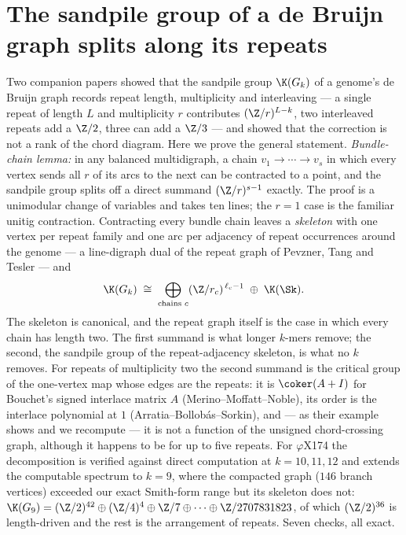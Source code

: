 \chapter{The sandpile group of a de Bruijn graph splits along its repeats}\label{chap:Bio3}
\begin{chapterabstract}
\noindent
Two companion papers showed that the sandpile group $\K(G_k)$ of a genome's de Bruijn
graph records repeat length, multiplicity and interleaving --- a single repeat of length
$L$ and multiplicity $r$ contributes $(\Z/r)^{L-k}$, two interleaved repeats add a $\Z/2$,
three can add a $\Z/3$ --- and showed that the correction is not a rank of the chord
diagram. Here we prove the general statement. \emph{Bundle-chain lemma:} in
any balanced multidigraph, a chain $v_1\to\cdots\to v_s$ in which every vertex sends all
$r$ of its arcs to the next can be contracted to a point, and the sandpile group splits
off a direct summand $(\Z/r)^{s-1}$ exactly. The proof is a unimodular change of
variables and takes ten lines; the $r=1$ case is the familiar unitig contraction.
Contracting every bundle chain leaves a \emph{skeleton} with one vertex per repeat family
and one arc per adjacency of repeat occurrences around the genome --- a line-digraph
dual of the repeat graph of Pevzner, Tang and Tesler --- and
\[
\K(G_k)\;\cong\;\bigoplus_{\text{chains }c}(\Z/r_c)^{\,\ell_c-1}\;\oplus\;\K(\Sk).
\]
The skeleton is canonical, and the repeat graph itself is the case in which every chain
has length two. The first summand is what longer $k$-mers remove; the second, the
sandpile group of the repeat-adjacency skeleton, is what no $k$ removes. For repeats of
multiplicity two the second summand is the critical group of the one-vertex map whose
edges are the repeats: it is $\coker(A+I)$ for Bouchet's signed interlace matrix $A$
(Merino--Moffatt--Noble), its order is the interlace polynomial at $1$
(Arratia--Bollob\'as--Sorkin), and --- as their example shows and we recompute --- it is
not a function of the unsigned chord-crossing graph, although it happens to be for up to
five repeats. For $\varphi$X174 the decomposition is
verified against direct computation at $k=10,11,12$ and extends the computable spectrum
to $k=9$, where the compacted graph ($146$ branch vertices) exceeded our exact Smith-form
range but its skeleton does not: $\K(G_9)=(\Z/2)^{42}\oplus(\Z/4)^{4}\oplus\Z/7\oplus
\cdots\oplus\Z/2707831823$, of which $(\Z/2)^{36}$ is length-driven and the rest is the
arrangement of repeats. Seven checks, all exact.
\end{chapterabstract}

